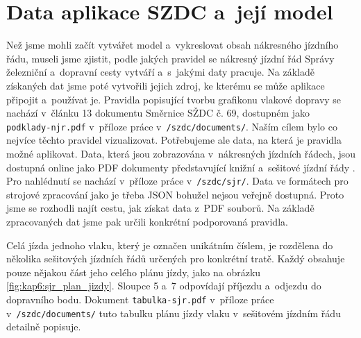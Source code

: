 \section{Data aplikace SZDC a~její model}
Než jsme mohli začít vytvářet model a~vykreslovat obsah nákresného jízdního řádu, museli jsme zjistit, podle jakých pravidel se nákresný jízdní řád Správy železniční a~dopravní cesty vytváří a~s~jakými daty pracuje. Na základě získaných dat jsme poté vytvořili jejich zdroj, ke kterému se může aplikace připojit a~používat je. Pravidla popisující tvorbu grafikonu vlakové dopravy se nachází v~článku 13 dokumentu Směrnice SŽDC č. 69, dostupném jako \texttt{podklady-njr.pdf} v~příloze práce v~\texttt{/szdc/documents/}. Naším cílem bylo co nejvíce těchto pravidel vizualizovat. Potřebujeme ale data, na která je pravidla možné aplikovat. Data, která jsou zobrazována v~nákresných jízdních řádech, jsou dostupná online jako PDF dokumenty představující knižní a~sešitové jízdní řády \cite{GVD_sjr}. Pro nahlédnutí se nachází v~příloze práce v~\texttt{/szdc/sjr/}. Data ve formátech pro strojové zpracování jako je třeba JSON bohužel nejsou veřejně dostupná. Proto jsme se rozhodli najít cestu, jak získat data z~PDF souborů. Na základě zpracovaných dat jsme pak určili konkrétní podporovaná pravidla.

Celá jízda jednoho vlaku, který je označen unikátním číslem, je rozdělena do několika sešitových jízdních řádů určených pro konkrétní tratě. Každý obsahuje pouze nějakou část jeho celého plánu jízdy, jako na obrázku \ref{fig:kap6:sjr_plan_jizdy}. Sloupce 5 a~7 odpovídají příjezdu a~odjezdu do dopravního bodu. Dokument \texttt{tabulka-sjr.pdf} v~příloze práce v~\texttt{/szdc/documents/} tuto tabulku plánu jízdy vlaku v~sešitovém jízdním řádu detailně popisuje.

